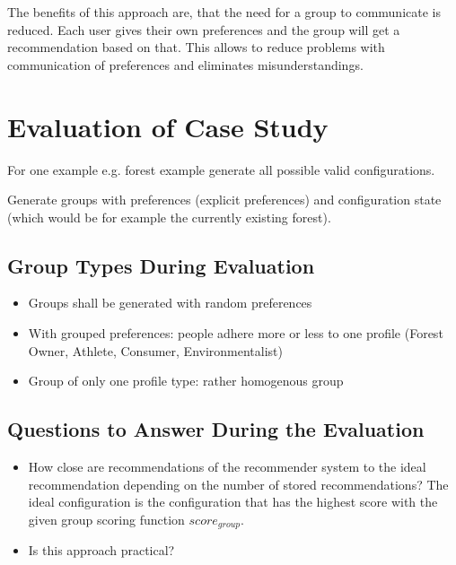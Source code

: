 \documentclass{article}
\begin{document}
The benefits of this approach are, that the need for a group to communicate is reduced. Each user gives their own preferences and the group will get a recommendation based on that. This allows to reduce problems with communication of preferences and eliminates misunderstandings.
    

\section{Evaluation of Case Study}

For one example e.g. forest example generate all possible valid configurations.

Generate groups with preferences (explicit preferences) and configuration state (which would be for example the currently existing forest).

\subsection{Group Types During Evaluation}
\begin{itemize}
    \item Groups shall be generated with random preferences
    \item With grouped preferences: people adhere more or less to one profile (Forest Owner, Athlete, Consumer, Environmentalist)
    \item Group of only one profile type: rather homogenous group
\end{itemize}

\subsection{Questions to Answer During the Evaluation}

\begin{itemize}
    \item How close are recommendations of the recommender system to the ideal recommendation depending on the number of stored recommendations? The ideal configuration is the configuration that has the highest score with the given group scoring function $score_{group}$.
    \item Is this approach practical?
\end{itemize}

\printbibliography[heading=bibintoc]
\end{document}
